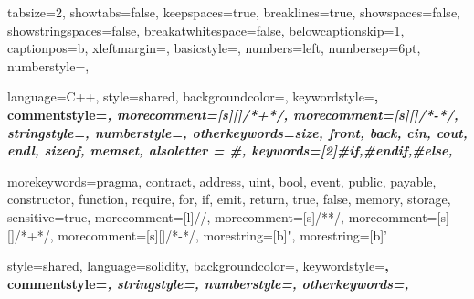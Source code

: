  {
  tabsize=2,
	showtabs=false,
	keepspaces=true,
  breaklines=true,
  showspaces=false,
  showstringspaces=false,
	breakatwhitespace=false,
  belowcaptionskip=1\baselineskip,
	captionpos=b,
  xleftmargin=\parindent,
	basicstyle=\ttfamily\footnotesize,
  numbers=left,
  numbersep=6pt,
	numberstyle=\tiny\color{lavenderindigo},
}


 {
  language=C++,
  style=shared,
	backgroundcolor=\color{eggshell},
	keywordstyle=\bfseries\color{egyptianblue},
	commentstyle=\itshape\color{lava},
  morecomment=[s][\color{forestgreen}]{/*+}{*/},
  morecomment=[s][\color{harvardcrimson}]{/*-}{*/},
	stringstyle=\color{greencssgreen},
	numberstyle=\tiny\color{lavenderindigo},
  otherkeywords={size, front, back, cin, cout, endl, sizeof, memset},
  alsoletter = {\#},
  keywords=[2]{\#if,\#endif,\#else},
}

 {
  morekeywords={pragma, contract, address, uint, bool, event, public,
    payable, constructor, function, require, for, if, emit, return,
    true, false, memory, storage},
  sensitive=true,
  morecomment=[l]{//},
  morecomment=[s]{/*}{*/},
  morecomment=[s][\color{forestgreen}]{/*+}{*/},
  morecomment=[s][\color{harvardcrimson}]{/*-}{*/},
  morestring=[b]",
  morestring=[b]'
}

 {
  style=shared,
  language=solidity,
	backgroundcolor=\color{eggshell},
	keywordstyle=\bfseries\color{egyptianblue},
	commentstyle=\itshape\color{lava},
	stringstyle=\color{greencssgreen},
	numberstyle=\tiny\color{lavenderindigo},
  otherkeywords={},
}
